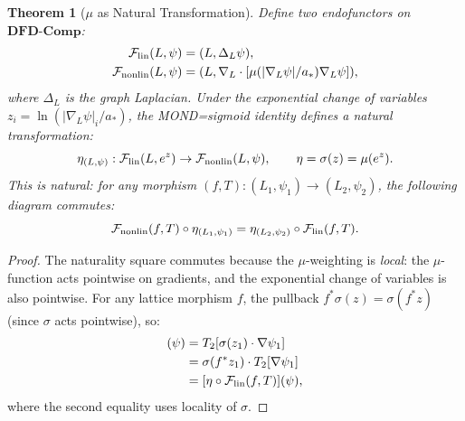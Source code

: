 \documentclass[11pt]{article}
\newtheorem{theorem}{Theorem}[section]
\theoremstyle{definition}
\theoremstyle{remark}
\begin{document}
\begin{theorem}[$\mu$ as Natural Transformation]
\label{thm:mu-natural-transformation}
Define two endofunctors on $\mathbf{DFD\text{-}Comp}$:
\begin{align}
  \mathcal{F}_{\rm lin}(L, \psi) &= (L, \Delta_L \psi), \label{eq:f-lin} \\
  \mathcal{F}_{\rm nonlin}(L, \psi) &= (L, \nabla_L \cdot [\mu(|\nabla_L\psi|/a_*) \nabla_L\psi]),
  \label{eq:f-nonlin}
\end{align}
where $\Delta_L$ is the graph Laplacian. Under the exponential
change of variables $z_i = \ln(|\nabla_L\psi|_i/a_*)$, the MOND=sigmoid
identity defines a natural transformation:
\begin{equation}
  \eta_{(L,\psi)}: \mathcal{F}_{\rm lin}(L, e^z) \to \mathcal{F}_{\rm nonlin}(L, \psi),
  \qquad \eta = \sigma(z) = \mu(e^z).
  \label{eq:natural-transformation}
\end{equation}
This is natural: for any morphism $(f, T): (L_1, \psi_1) \to (L_2, \psi_2)$,
the following diagram commutes:
\begin{equation}
  \mathcal{F}_{\rm nonlin}(f,T) \circ \eta_{(L_1,\psi_1)} =
  \eta_{(L_2,\psi_2)} \circ \mathcal{F}_{\rm lin}(f,T).
  \label{eq:naturality-square}
\end{equation}
\end{theorem}

\begin{proof}
The naturality square commutes because the $\mu$-weighting is
\emph{local}: the $\mu$-function acts pointwise on gradients, and the
exponential change of variables is also pointwise. For any lattice morphism
$f$, the pullback $f^*\sigma(z) = \sigma(f^*z)$ (since $\sigma$ acts
pointwise), so:
\begin{align}
  [\mathcal{F}_{\rm nonlin}(f,T) \circ \eta](\psi)
  &= T_2[\sigma(z_1) \cdot \nabla\psi_1] \\
  &= \sigma(f^*z_1) \cdot T_2[\nabla\psi_1] \\
  &= [\eta \circ \mathcal{F}_{\rm lin}(f,T)](\psi),
\end{align}
where the second equality uses locality of $\sigma$.
\end{proof}
\end{document}
